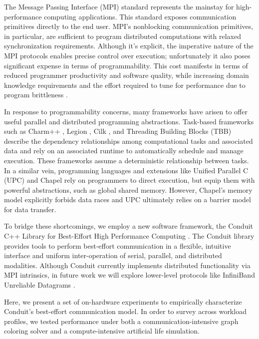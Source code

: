 The Message Passing Interface (MPI) standard \citep{gropp1996high} represents the mainstay for high-performance computing applications.
This standard exposes communication primitives directly to the end user.
MPI's nonblocking communication primitives, in particular, are sufficient to program distributed computations with relaxed synchronization requirements.
Although it's explicit, the imperative nature of the MPI protocols enables precise control over execution; unfortunately it also poses significant expense in terms of programmability.
This cost manifests in terms of reduced programmer productivity and software quality, while increasing domain knowledge requirements and the effort required to tune for performance due to program brittleness \citep{gu2019comparative, tang2014mpi}.

In response to programmability concerns, many frameworks have arisen to offer useful parallel and distributed programming abstractions.
Task-based frameworks such as Charm++ \citep{kale1993charm++}, Legion \citep{bauer2012legion}, Cilk \citep{blumofe1996cilk}, and Threading Building Blocks (TBB) \citep{reinders2007intel} describe the dependency relationships among computational tasks and associated data and rely on an associated runtime to automatically schedule and manage execution.
These frameworks assume a deterministic relationship between tasks.
In a similar vein, programming languages and extensions like Unified Parallel C (UPC) \citep{el2006upc} and Chapel \citep{chamberlain2007parallel} rely on programmers to direct execution, but equip them with powerful abstractions, such as global shared memory.
However, Chapel's memory model explicitly forbids data races and UPC ultimately relies on a barrier model for data transfer.

To bridge these shortcomings, we employ a new software framework, the Conduit C++ Library for Best-Effort High Performance Computing \citep{moreno2021conduit}.
The Conduit library provides tools to perform best-effort communication in a flexible, intuitive interface and uniform inter-operation of serial, parallel, and distributed modalities.
Although Conduit currently implements distributed functionality via MPI intrinsics, in future work we will explore lower-level protocols like InfiniBand Unreliable Datagrams \citep{kashyap2006ip, koop2007high}.

Here, we present a set of on-hardware experiments to empirically characterize Conduit's best-effort communication model.
In order to survey across workload profiles, we tested performance under both a communication-intensive graph coloring solver and a compute-intensive artificial life simulation.

